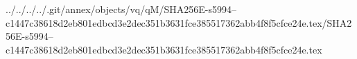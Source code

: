 ../../../../.git/annex/objects/vq/qM/SHA256E-s5994--c1447c38618d2eb801edbcd3e2dec351b3631fce385517362abb4f8f5cfce24e.tex/SHA256E-s5994--c1447c38618d2eb801edbcd3e2dec351b3631fce385517362abb4f8f5cfce24e.tex